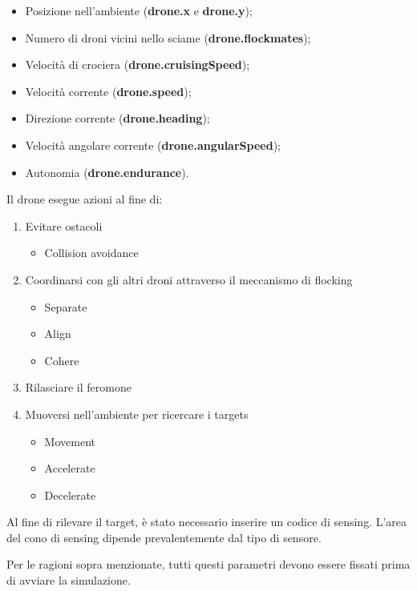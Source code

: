 \begin{itemize}
    \item Posizione nell’ambiente (\textbf{drone.x} e \textbf{drone.y});
    \item Numero di droni vicini nello sciame (\textbf{drone.flockmates});
    \item Velocità di crociera (\textbf{drone.cruisingSpeed});
    \item Velocità corrente (\textbf{drone.speed});
    \item Direzione corrente (\textbf{drone.heading});
    \item Velocità angolare corrente (\textbf{drone.angularSpeed});
    \item Autonomia (\textbf{drone.endurance}).
\end{itemize}
Il drone esegue azioni al fine di:

\begin{enumerate}
    \item Evitare ostacoli
    \begin{itemize}
        \item Collision avoidance
    \end{itemize}
    \item Coordinarsi con gli altri droni attraverso il meccanismo di flocking
    \begin{itemize}
        \item Separate
        \item Align
        \item Cohere
    \end{itemize}
    \item Rilasciare il feromone
    \item Muoversi nell’ambiente per ricercare i targets
    \begin{itemize}
        \item Movement
        \item Accelerate
        \item Decelerate
    \end{itemize}
\end{enumerate}

Al fine di rilevare il target, è stato necessario inserire un codice di sensing. L’area del cono di sensing dipende prevalentemente dal tipo di sensore. 

Per le ragioni sopra menzionate, tutti questi parametri devono essere fissati prima di avviare la simulazione.

